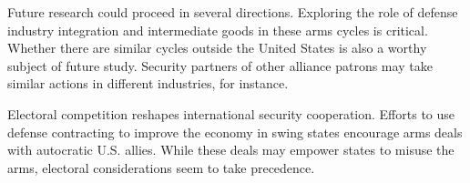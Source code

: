 \documentclass[12pt]{article}
\begin{document}
Future research could proceed in several directions. 
Exploring the role of defense industry integration and intermediate goods in these arms cycles is critical.
Whether there are similar cycles outside the United States is also a worthy subject of future study. 
Security partners of other alliance patrons may take similar actions in different industries, for instance.


Electoral competition reshapes international security cooperation.
Efforts to use defense contracting to improve the economy in swing states encourage arms deals with autocratic U.S. allies.
While these deals may empower states to misuse the arms, electoral considerations seem to take precedence. 


\newpage
\singlespace
 
 
\end{document}
